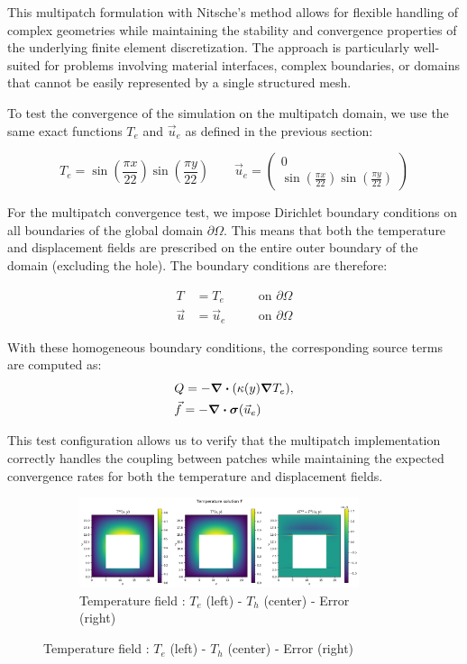 \documentclass[a4paper,12pt,twoside]{report}
\begin{document}
This multipatch formulation with Nitsche's method allows for flexible handling of complex geometries while maintaining the stability and convergence properties of the underlying finite element discretization. The approach is particularly well-suited for problems involving material interfaces, complex boundaries, or domains that cannot be easily represented by a single structured mesh.

To test the convergence of the simulation on the multipatch domain, we use the same exact functions $T_e$ and $\vec{u}_e$ as defined in the previous section:

$$
T_e = \sin\left(\frac{\pi x}{22}\right) \sin\left(\frac{\pi y}{22}\right) \qquad \vec u_e = \begin{pmatrix}
	0 \\
	\sin\left(\frac{\pi x}{22}\right) \sin\left(\frac{\pi y}{22}\right) 
\end{pmatrix}
$$

For the multipatch convergence test, we impose Dirichlet boundary conditions on all boundaries of the global domain $\partial\Omega$. This means that both the temperature and displacement fields are prescribed on the entire outer boundary of the domain (excluding the hole). The boundary conditions are therefore:

\begin{align}
	T &= T_e \quad &&\text{on } \partial\Omega \\
	\vec u &= \vec u_e \quad &&\text{on } \partial\Omega
\end{align}

With these homogeneous boundary conditions, the corresponding source terms are computed as:
\begin{equation*}
	\begin{aligned}
	& Q = - \div(\kappa(y) \grad T_e), \\
	& \vec f = -\div \boldsymbol{\sigma}(\vec u_e)
	\end{aligned}
\end{equation*}

This test configuration allows us to verify that the multipatch implementation correctly handles the coupling between patches while maintaining the expected convergence rates for both the temperature and displacement fields.

\begin{figure}[!h]
	\centering
	\begin{subfigure}[b]{\textwidth}
		\centering
		\includegraphics[width=0.9\textwidth]{figures/figures_multipatch/temperature.png}
		\caption{Temperature field : $T_e$ (left) - $T_h$ (center) - Error (right)}
	\end{subfigure}
\end{figure}
\end{document}
